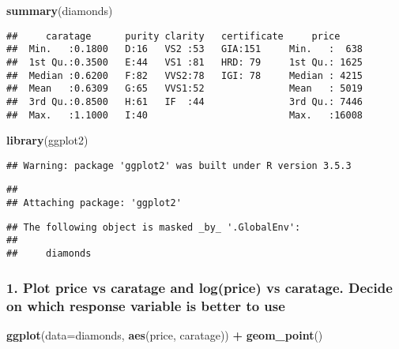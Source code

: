 \documentclass[]{article}
\newenvironment{Shaded}{\begin{snugshade}}{\end{snugshade}}
\newcommand{\KeywordTok}[1]{\textcolor[rgb]{0.13,0.29,0.53}{\textbf{#1}}}
\newcommand{\DataTypeTok}[1]{\textcolor[rgb]{0.13,0.29,0.53}{#1}}
\newcommand{\StringTok}[1]{\textcolor[rgb]{0.31,0.60,0.02}{#1}}
\newcommand{\OperatorTok}[1]{\textcolor[rgb]{0.81,0.36,0.00}{\textbf{#1}}}
\newcommand{\NormalTok}[1]{#1}
\begin{document}
\begin{Shaded}
\begin{Highlighting}[]
\KeywordTok{summary}\NormalTok{(diamonds)}
\end{Highlighting}
\end{Shaded}

\begin{verbatim}
##     caratage      purity clarity   certificate     price      
##  Min.   :0.1800   D:16   VS2 :53   GIA:151     Min.   :  638  
##  1st Qu.:0.3500   E:44   VS1 :81   HRD: 79     1st Qu.: 1625  
##  Median :0.6200   F:82   VVS2:78   IGI: 78     Median : 4215  
##  Mean   :0.6309   G:65   VVS1:52               Mean   : 5019  
##  3rd Qu.:0.8500   H:61   IF  :44               3rd Qu.: 7446  
##  Max.   :1.1000   I:40                         Max.   :16008
\end{verbatim}

\begin{Shaded}
\begin{Highlighting}[]
\KeywordTok{library}\NormalTok{(ggplot2)}
\end{Highlighting}
\end{Shaded}

\begin{verbatim}
## Warning: package 'ggplot2' was built under R version 3.5.3
\end{verbatim}

\begin{verbatim}
## 
## Attaching package: 'ggplot2'
\end{verbatim}

\begin{verbatim}
## The following object is masked _by_ '.GlobalEnv':
## 
##     diamonds
\end{verbatim}

\subsubsection{1. Plot price vs caratage and log(price) vs caratage.
Decide on which response variable is better to
use}\label{plot-price-vs-caratage-and-logprice-vs-caratage.-decide-on-which-response-variable-is-better-to-use}

\begin{Shaded}
\begin{Highlighting}[]
\KeywordTok{ggplot}\NormalTok{(}\DataTypeTok{data=}\NormalTok{diamonds, }\KeywordTok{aes}\NormalTok{(price, caratage)) }\OperatorTok{+}\StringTok{ }
\StringTok{        }\KeywordTok{geom_point}\NormalTok{()}
\end{Highlighting}
\end{Shaded}
\end{document}
